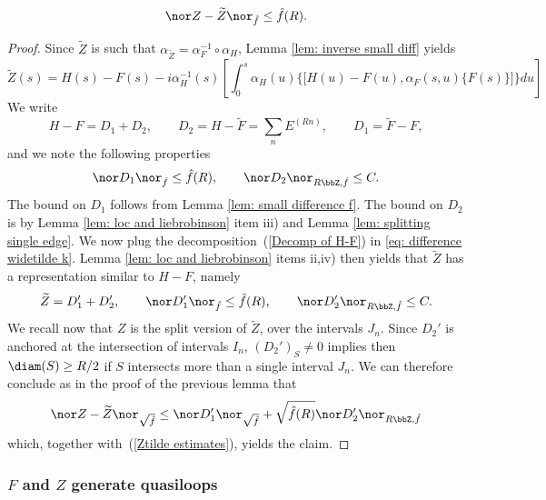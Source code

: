 \begin{lemma}\label{lem: small differences k}
	$$
	\nor Z-\widetilde Z\nor_{\hat{f}} \leq \hat{f}(R).
	$$
\end{lemma}
\begin{proof}
	Since $\widetilde Z$ is such that $\alpha_{\widetilde Z}=\alpha_{F}^{-1} \circ \alpha_H$, Lemma \ref{lem: inverse small diff} yields
	\begin{equation}\label{eq: difference widetilde k}
	\widetilde Z(s)=H(s)-F(s)- i \alpha^{-1}_{H}(s)\left[\int_0^s \alpha_{H}(u)\Big\{\big[H(u) - F(u),\alpha_F(s,u)\{F(s)\}\big]\Big\}du \right]
	\end{equation}
	We write
	\begin{equation}\label{Decomp of H-F}
	H-F = D_1+D_2,\qquad  D_2= H - \widetilde F = \sum_n E^{(Rn)}, \qquad  D_1= \widetilde F - F,
	\end{equation}
	and we note the following properties
	$$
	\nor D_1\nor_{\hat{f}}\leq \hat{f}(R),\qquad   \nor D_2\nor_{R\bbZ,\hat{f}}\leq C.
	$$ 
	The bound on $D_1$ follows from Lemma \ref{lem: small difference f}. The bound on $D_2$ is by Lemma \ref{lem: loc and liebrobinson} item iii) and Lemma \ref{lem: splitting single edge}.  
	We now plug the decomposition~(\ref{Decomp of H-F}) in \eqref{eq: difference widetilde k}. Lemma \ref{lem: loc and liebrobinson} items ii,iv) then yields that $\widetilde Z$ has a representation similar to $H-F$, namely
	\begin{equation}\label{Ztilde estimates}
	\widetilde Z = D_1'+D'_2,\qquad   \nor D_1'\nor_{\hat{f}} \leq   \hat{f}(R),\qquad  \nor D_2'\nor_{R\bbZ,\hat{f}} \leq   C.
	\end{equation}
	We recall now that $Z$ is the split version of $\widetilde Z$, over the intervals $J_n$. Since $D_2'$ is anchored at the intersection of intervals $I_n$, $(D_2')_S \neq 0$ implies then $\diam(S) \geq R/2$ if $S$ intersects more than a single interval $J_n$. We can therefore conclude as in the proof of the previous lemma that
	$$
	\nor Z-\widetilde Z \nor_{\sqrt{\hat{f}}} \leq  \nor D_1' \nor_{\sqrt{\hat{f}}}+ \sqrt{\hat{f}(R)} \nor D_2'\nor_{R\bbZ,\hat{f}}
	$$  which, together with~(\ref{Ztilde estimates}), yields the claim.
\end{proof}









\subsubsection{$F$ and $Z$ generate quasiloops}\label{sec: quasiloops}




